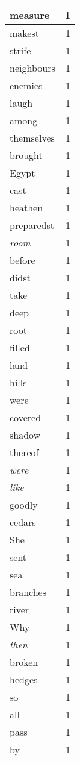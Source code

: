 \begin{center}
\begin{longtable}{l|r}
measure & 1 \\ \hline
makest & 1 \\ \hline
strife & 1 \\ \hline
neighbours & 1 \\ \hline
enemies & 1 \\ \hline
laugh & 1 \\ \hline
among & 1 \\ \hline
themselves & 1 \\ \hline
brought & 1 \\ \hline
Egypt & 1 \\ \hline
cast & 1 \\ \hline
heathen & 1 \\ \hline
preparedst & 1 \\ \hline
\emph{room} & 1 \\ \hline
before & 1 \\ \hline
didst & 1 \\ \hline
take & 1 \\ \hline
deep & 1 \\ \hline
root & 1 \\ \hline
filled & 1 \\ \hline
land & 1 \\ \hline
hills & 1 \\ \hline
were & 1 \\ \hline
covered & 1 \\ \hline
shadow & 1 \\ \hline
thereof & 1 \\ \hline
\emph{were} & 1 \\ \hline
\emph{like} & 1 \\ \hline
goodly & 1 \\ \hline
cedars & 1 \\ \hline
She & 1 \\ \hline
sent & 1 \\ \hline
sea & 1 \\ \hline
branches & 1 \\ \hline
river & 1 \\ \hline
Why & 1 \\ \hline
\emph{then} & 1 \\ \hline
broken & 1 \\ \hline
hedges & 1 \\ \hline
so & 1 \\ \hline
all & 1 \\ \hline
pass & 1 \\ \hline
by & 1 \\ \hline

\end{longtable}
\end{center}
